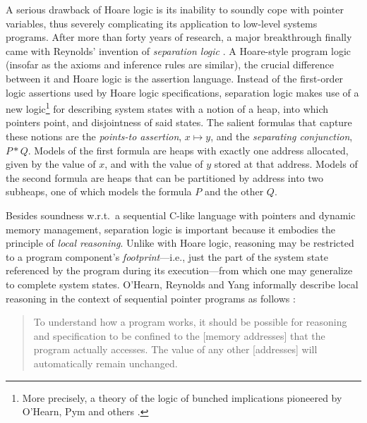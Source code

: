 \documentclass[11pt]{report}
\begin{document}
A serious drawback of Hoare logic is its inability to soundly cope with pointer variables, thus severely complicating its application to low-level systems programs. After more than forty years of research, a major breakthrough finally came with Reynolds' invention of \emph{separation logic} \cite{DBLP:conf/lics/Reynolds02}. A Hoare-style program logic (insofar as the axioms and inference rules are similar), the crucial difference between it and Hoare logic is the assertion language. Instead of the first-order logic assertions used by Hoare logic specifications, separation logic makes use of a new logic\footnote{More precisely, a theory of the logic of bunched implications pioneered by O'Hearn, Pym and others \cite{DBLP:journals/bsl/OHearnP99,DBLP:journals/tcs/PymOY04}.}  for describing system states with a notion of a heap, into which pointers point, and disjointness of said states. The salient formulas that capture these notions are the \emph{points-to assertion}, $x \mapsto y$, and the \emph{separating conjunction}, $P * Q$. Models of the first formula are heaps with exactly one address allocated, given by the value of $x$, and with the value of $y$ stored at that address. Models of the second formula are heaps that can be partitioned by address into two subheaps, one of which models the formula $P$ and the other $Q$.

Besides soundness w.r.t.~a sequential C-like language with pointers and dynamic memory management, separation logic is important because it embodies the principle of \emph{local reasoning}. Unlike with Hoare logic, reasoning may be restricted to a program component's \emph{footprint}---i.e., just the part of the system state referenced by the program during its execution---from which one may generalize to complete system states. O'Hearn, Reynolds and Yang informally describe local reasoning in the context of sequential pointer programs as follows \cite{DBLP:conf/csl/OHearnRY01}: \begin{quotation}\noindent To understand how a program works, it should be possible for reasoning and specification to be confined to the [memory addresses] that the program actually accesses. The value of any other [addresses] will automatically remain unchanged.\end{quotation}
\end{document}
